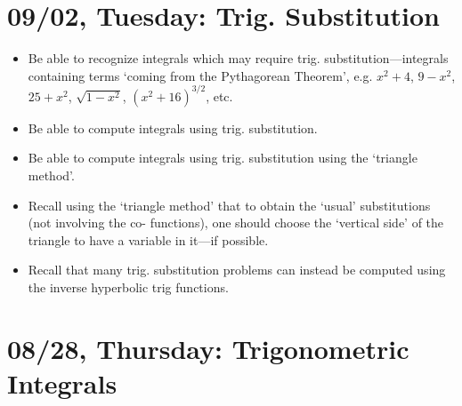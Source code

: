 \documentclass[11pt,letterpaper]{article}
\begin{document}
\newpage
\section*{09/02, Tuesday: Trig. Substitution\label{09-02}}

\begin{itemize}
\item Be able to recognize integrals which may require trig. substitution---integrals containing terms `coming from the Pythagorean Theorem', e.g. $x^2 + 4$, $9 - x^2$, $25 + x^2$, $\sqrt{1 - x^2}$, $(x^2 + 16)^{3/2}$, etc.

\item Be able to compute integrals using trig. substitution. 

\item Be able to compute integrals using trig. substitution using the `triangle method'. 

\item Recall using the `triangle method' that to obtain the `usual' substitutions (not involving the co- functions), one should choose the `vertical side' of the triangle to have a variable in it---if possible.

\item Recall that many trig. substitution problems can instead be computed using the inverse hyperbolic trig functions. 
\end{itemize}

\newpage
\section*{08/28, Thursday: Trigonometric Integrals\label{08-28}}
\end{document}

